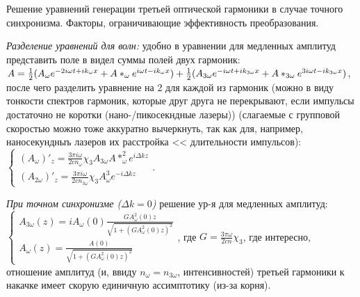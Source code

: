 
\begin{leftrules}
Решение уравнений генерации третьей оптической гармоники в случае точного синхронизма. Факторы, ограничивающие эффективность преобразования.
\end{leftrules}




\textit{Разделение уравнений для волн:} удобно в уравнении для медленных амплитуд представить поле в видел суммы полей двух гармоник: $A = \frac{1}{2} (A_{\omega}e^{-2i\omega t +i k_{\omega}x} + A*_{\omega}e^{i\omega t -i k_{\omega}x}) + \\ \frac{1}{2} (A_{3\omega}e^{-i\omega t +i k_{3\omega}x} + A*_{3\omega}e^{3i\omega t -i k_{3\omega}x})$, после чего разделить уравнение на 2 для каждой из гармоник (можно в виду тонкости спектров гармоник, которые друг друга не перекрывают, если импульсы достаточно не коротки (нано-/пикосекндные лазеры)) (слагаемые с групповой скоростью можно тоже аккуратно вычеркнуть, так как для, например, наносекундныъ лазеров их расстройка << длительности импульсов): $
    \begin{cases}
        (A_{\omega})'_{z}=\frac{3\pi i \omega}{2cn_{\omega}} \chi_{3} A_{3\omega}A*_{\omega}^{2} e^{i \Delta k z} \\
        (A_{2\omega})'_{z}=\frac{3\pi i \omega}{2cn_{3\omega}} \chi_{3} A_{\omega}^{3} e^{- i \Delta k z} 
    \end{cases}$.


\textit{При точном синхронизме ($\Delta k = 0$)} решение ур-я для медленных амплитуд: \\$
    \begin{cases}
        A_{3\omega}(z)=iA_{\omega}(0)\frac{GA_{\omega}^{2}(0)z}{\sqrt{1+(GA_{\omega}^{2}(0)z)^{2}}} \\
        A_{\omega}(z)=\frac{A(0)}{\sqrt{1+(GA_{\omega}^{2}(0)z)^{2}}}
    \end{cases}$, где $G=\frac{3\pi \omega}{2cn}\chi_{3}$, где интересно, отношение амплитуд (и, ввиду $n_{\omega}=n_{3\omega}$, интенсивностей) третьей гармоники к накачке имеет скорую единичную ассимптотику (из-за корня).


